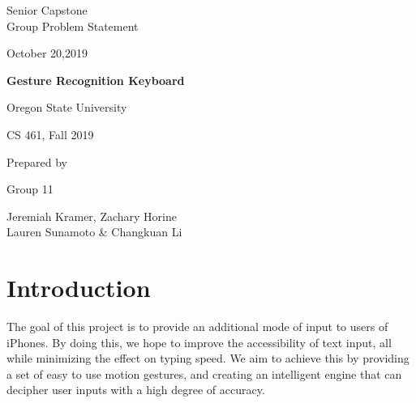 \documentclass[onecolumn,draftclsnofoot,10pt, journal, letterpaper]{IEEEtran}
\def \CapstoneTeamNumber{11}
\def \GroupMemberOne{Jeremiah Kramer}
\def \GroupMemberTwo{Zachary Horine}
\def \GroupMemberThree{Lauren Sunamoto }
\def \GroupMemberFour{Changkuan Li}
\def \CapstoneProjectName{Gesture Recognition Keyboard}
\def \DocType{Group Problem Statement}
\begin{document}
\begin{titlepage}
    \begin{singlespace}
        \hfill 
        \par\vspace{.2in}
        \centering
        \scshape{
            \huge Senior Capstone \\ \DocType \par
            {\large{October 20,2019}}\par
            \vspace{.5in}
            \textbf{\Huge\CapstoneProjectName}\par
            \vfill
            \huge Oregon State University \par
            \huge  CS 461, Fall 2019 \par
            \vspace{10pt}
            {\large Prepared by }\par
            Group \CapstoneTeamNumber\par
            \vspace{10pt}
            {\Large
                \GroupMemberOne, \GroupMemberTwo \\ \GroupMemberThree \& \GroupMemberFour
            }
            \vspace{40pt}
        }
        \begin{abstract}
            \normalsize
            The goal of this paper is to explain the problem and proposed solution of this group. The problem we are attempting to tackle is input accessibility on iPhones. There are many different keyboards available for iPhones, but these keyboards mainly only focus on language support, and not accessibility. By creating a keyboard that implements an intelligent gesture recognition engine, we will be able to provide a method for those with limited dexterity to input text in a way that makes sense for them. We are aiming to create an intelligent system that is able to determine what the user is typing with a 85\% or greater accuracy, and still maintain about half the speed of normal typing.
        \end{abstract}     
    \end{singlespace}
\end{titlepage}
\newpage
{}

\newpage
\section{Introduction}
The goal of this project is to provide an additional mode of input to users of iPhones. By doing this, we hope to improve the accessibility of text input, all while minimizing the effect on typing speed. We aim to achieve this by providing a set of easy to use motion gestures, and creating an intelligent engine that can decipher user inputs with a high degree of accuracy.
\end{document}

